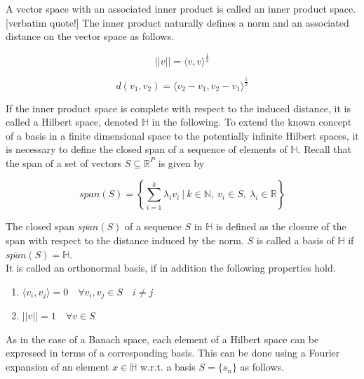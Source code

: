 \documentclass[11pt,twoside,a4paper]{article}
\begin{document}
	A vector space with an associated inner product is called an inner product space. {\color{red}[verbatim quote!]}
	The inner product naturally defines a norm and an associated distance on the vector space as follows.
	
	\begin{equation}
		\lvert \lvert v \rvert \rvert = {\langle v, v \rangle}^{\frac{1}{2}}
	\end{equation}

	\begin{equation}
		d(v_1, v_2) = {\langle v_2 - v_1, v_2 - v_1 \rangle}^{\frac{1}{2}}
	\end{equation}
	
	If the inner product space is complete with respect to the induced distance, it is called a Hilbert space, denoted $\mathbb{H}$ in the following. To extend the known concept of a basis in a finite dimensional space to the potentially infinite Hilbert spaces, it is necessary to define the closed span of a sequence of elements of $\mathbb{H}$. Recall that the span of a set of vectors $S \subseteq \mathbb{R}^P$ is given by
	
	\begin{equation}
		span(S) = \left\{\sum_{i = 1}^{k} \lambda_i v_i \: \bigg\vert \: k \in \mathbb{N}, \: v_i \in S, \: \lambda_i \in \mathbb{R} \right\}
	\end{equation}
			
	The closed span $\overline{span}(S)$ of a sequence $S$ in $\mathbb{H}$ is defined as the closure of the span with respect to the distance induced by the norm. $S$ is called a basis of $\mathbb{H}$ if $\overline{span}(S) = \mathbb{H}$. \\
	It is called an orthonormal basis, if in addition the following properties hold. 
	
	\begin{multicols}{2}
		\begin{enumerate}
			\item $\langle v_i, v_j \rangle = 0 \quad \forall v_i, v_j \in S \quad i \neq j$
			\item $\lvert \lvert v \rvert \rvert = 1 \quad \forall v \in S$
		\end{enumerate}
	\end{multicols}

	As in the case of a Banach space, each element of a Hilbert space can be expressed in terms of a corresponding basis. This can be done using a Fourier expansion of an element $x \in \mathbb{H}$ w.r.t. a basis $S = \{s_n\}$ as follows.
	
\end{document}
